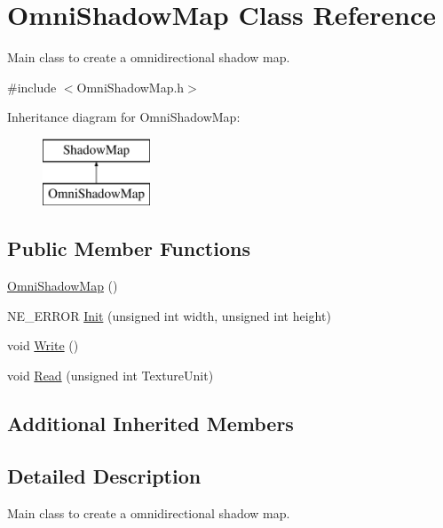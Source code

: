 \hypertarget{class_omni_shadow_map}{}\section{Omni\+Shadow\+Map Class Reference}
\label{class_omni_shadow_map}


Main class to create a omnidirectional shadow map.  




{\ttfamily \#include $<$Omni\+Shadow\+Map.\+h$>$}

Inheritance diagram for Omni\+Shadow\+Map\+:\begin{figure}[H]
\begin{center}
\leavevmode
\includegraphics[height=2.000000cm]{class_omni_shadow_map}
\end{center}
\end{figure}
\subsection*{Public Member Functions}
\begin{DoxyCompactItemize}
\item 
\mbox{\hyperlink{class_omni_shadow_map_a546a081c019229fec62b38f165b2f995}{Omni\+Shadow\+Map}} ()
\item 
N\+E\+\_\+\+E\+R\+R\+OR \mbox{\hyperlink{class_omni_shadow_map_a3236b048abb7375dc0d43852a37f4739}{Init}} (unsigned int width, unsigned int height)
\item 
void \mbox{\hyperlink{class_omni_shadow_map_aafd4e0d6b4cf265b59c67585c35622de}{Write}} ()
\item 
void \mbox{\hyperlink{class_omni_shadow_map_ae2c39deb32f33b8c6f461f4525a1d552}{Read}} (unsigned int Texture\+Unit)
\end{DoxyCompactItemize}
\subsection*{Additional Inherited Members}


\subsection{Detailed Description}
Main class to create a omnidirectional shadow map. 

